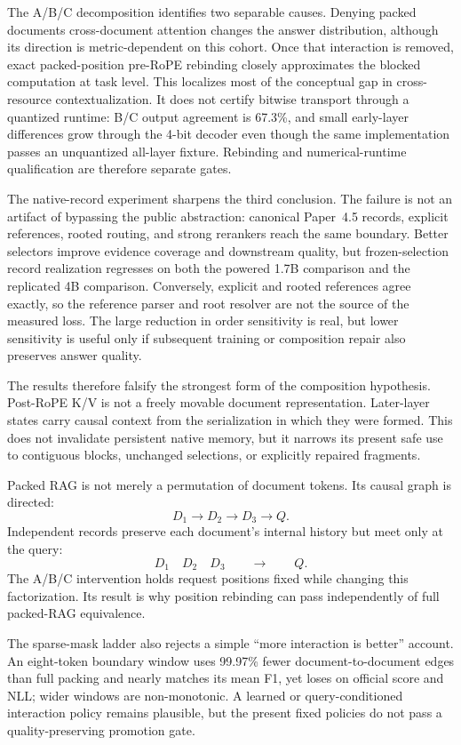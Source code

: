 \documentclass[11pt]{article}
\begin{document}
The A/B/C decomposition identifies two separable causes. Denying packed
documents cross-document attention changes the answer distribution, although
its direction is metric-dependent on this cohort. Once that interaction is
removed, exact packed-position pre-RoPE rebinding closely approximates the
blocked computation at task level. This localizes most of the conceptual gap in
cross-resource contextualization. It does not certify bitwise transport through
a quantized runtime: B/C output agreement is 67.3\%, and small early-layer
differences grow through the 4-bit decoder even though the same implementation
passes an unquantized all-layer fixture. Rebinding and numerical-runtime
qualification are therefore separate gates.

The native-record experiment sharpens the third conclusion. The failure is not
an artifact of bypassing the public abstraction: canonical Paper~4.5 records,
explicit references, rooted routing, and strong rerankers reach the same
boundary. Better selectors improve evidence coverage and downstream quality,
but frozen-selection record realization regresses on both the powered 1.7B
comparison and the replicated 4B comparison. Conversely, explicit and rooted references agree exactly, so the
reference parser and root resolver are not the source of the measured loss.
The large reduction in order sensitivity is real, but lower sensitivity is
useful only if subsequent training or composition repair also preserves answer
quality.

The results therefore falsify the strongest form of the composition hypothesis.
Post-RoPE K/V is not a freely movable document representation. Later-layer
states carry causal context from the serialization in which they were formed.
This does not invalidate persistent native memory, but it narrows its present
safe use to contiguous blocks, unchanged selections, or explicitly repaired
fragments.

Packed RAG is not merely a permutation of document tokens. Its causal graph is
directed:
\[
D_1 \longrightarrow D_2 \longrightarrow D_3 \longrightarrow Q.
\]
Independent records preserve each document's internal history but meet only at
the query:
\[
D_1\quad D_2\quad D_3
\qquad\longrightarrow\qquad Q.
\]
The A/B/C intervention holds request positions fixed while changing this
factorization. Its result is why position rebinding can pass independently of
full packed-RAG equivalence.

The sparse-mask ladder also rejects a simple ``more interaction is better''
account. An eight-token boundary window uses 99.97\% fewer document-to-document
edges than full packing and nearly matches its mean F1, yet loses on official
score and NLL; wider windows are non-monotonic. A learned or query-conditioned
interaction policy remains plausible, but the present fixed policies do not
pass a quality-preserving promotion gate.
\end{document}
